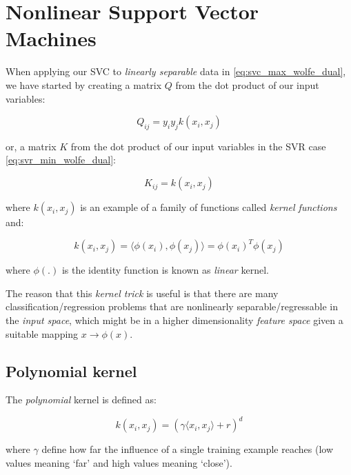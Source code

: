 \section{Nonlinear Support Vector Machines}

When applying our SVC to \emph{linearly separable} data in \ref{eq:svc_max_wolfe_dual}, we have started by creating a matrix $Q$ from the dot product of our input variables:

\begin{equation} \label{eq:svc_hessian}
	Q_{ij} = y_i y_j k(x_i,x_j)
\end{equation}

or, a matrix $K$ from the dot product of our input variables in the SVR case \ref{eq:svr_min_wolfe_dual}:

\begin{equation} \label{eq:svr_hessian}
	K_{ij} = k(x_i,x_j)
\end{equation}

where $k(x_i,x_j)$ is an example of a family of functions called \emph{kernel functions} and:  

\begin{equation} \label{eq:kernel_function}
	k(x_i,x_j) = \langle \phi(x_i), \phi(x_j) \rangle = \phi(x_i)^T \phi(x_j)
\end{equation}

where $\phi(.)$ is the identity function is known as \emph{linear} kernel.

The reason that this \emph{kernel trick} is useful is that there are many classification/regression problems that are nonlinearly separable/regressable in the \emph{input space}, which might be in a higher dimensionality \emph{feature space} given a suitable mapping $x \rightarrow \phi(x)$.

\subsection{Polynomial kernel}

The \emph{polynomial} kernel is defined as:

\begin{equation} \label{eq:poly_kernel}
	k(x_i,x_j)=(\gamma \langle x_i, x_j\rangle + r)^d
\end{equation}

where $\gamma$ define how far the influence of a single training example reaches (low values meaning ‘far’ and high values meaning ‘close’).

